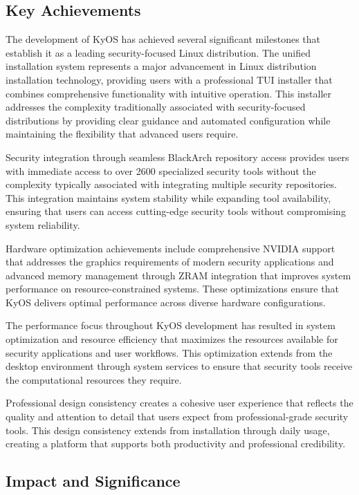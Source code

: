 \documentclass[12pt,a4paper]{article}
\begin{document}
\subsection{Key Achievements}

The development of KyOS has achieved several significant milestones that establish it as a leading security-focused Linux distribution. The unified installation system represents a major advancement in Linux distribution installation technology, providing users with a professional TUI installer that combines comprehensive functionality with intuitive operation. This installer addresses the complexity traditionally associated with security-focused distributions by providing clear guidance and automated configuration while maintaining the flexibility that advanced users require.

Security integration through seamless BlackArch repository access provides users with immediate access to over 2600 specialized security tools without the complexity typically associated with integrating multiple security repositories. This integration maintains system stability while expanding tool availability, ensuring that users can access cutting-edge security tools without compromising system reliability.

Hardware optimization achievements include comprehensive NVIDIA support that addresses the graphics requirements of modern security applications and advanced memory management through ZRAM integration that improves system performance on resource-constrained systems. These optimizations ensure that KyOS delivers optimal performance across diverse hardware configurations.

The performance focus throughout KyOS development has resulted in system optimization and resource efficiency that maximizes the resources available for security applications and user workflows. This optimization extends from the desktop environment through system services to ensure that security tools receive the computational resources they require.

Professional design consistency creates a cohesive user experience that reflects the quality and attention to detail that users expect from professional-grade security tools. This design consistency extends from installation through daily usage, creating a platform that supports both productivity and professional credibility.

\subsection{Impact and Significance}
\end{document}
